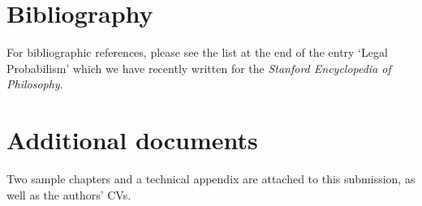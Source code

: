 \documentclass[
  10pt,
  dvipsnames,enabledeprecatedfontcommands]{scrartcl}
\begin{document}
\hypertarget{bibliography}{%
\section{Bibliography}\label{bibliography}}

For bibliographic references, please see the list at the end of the
entry `Legal Probabilism' which we have recently written for the
\textit{Stanford Encyclopedia of Philosophy}.

\hypertarget{additional-documents}{%
\section{Additional documents}\label{additional-documents}}

Two sample chapters and a technical appendix are attached to this
submission, as well as the authors' CVs.
\end{document}
